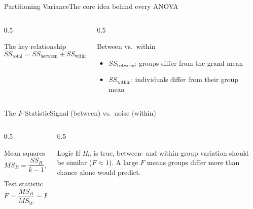 \documentclass[aspectratio=169,11pt]{beamer}
\begin{document}
\begin{frame}{Partitioning Variance}{The core idea behind every ANOVA}
  \begin{columns}[T]
    \begin{column}{0.5\textwidth}
      \begin{block}{The key relationship}
        \[ SS_{\text{total}} = SS_{\text{between}} + SS_{\text{within}} \]
      \end{block}
    \end{column}
    \begin{column}{0.5\textwidth}
      \begin{exampleblock}{Between vs.\ within}
        \small
        \begin{itemize}
          \item $SS_{\text{between}}$: groups differ from the grand mean
          \item $SS_{\text{within}}$: individuals differ from their group mean
        \end{itemize}
      \end{exampleblock}
    \end{column}
  \end{columns}
  \vfill
  \centering
\end{frame}

\begin{frame}{The $F$-Statistic}{Signal (between) vs.\ noise (within)}
  \begin{columns}[T]
    \begin{column}{0.5\textwidth}
      \begin{block}{Mean squares}
        \[ MS_B = \frac{SS_B}{k-1}, \qquad MS_W = \frac{SS_W}{N-k} \]
      \end{block}
      \begin{exampleblock}{Test statistic}
        \[ F = \frac{MS_B}{MS_W} \sim F_{k-1,\,N-k} \]
      \end{exampleblock}
    \end{column}
    \begin{column}{0.5\textwidth}
      \begin{alertblock}{Logic}
        \small If $H_0$ is true, between- and within-group variation should
        be similar ($F\approx 1$). A large $F$ means groups differ more
        than chance alone would predict.
      \end{alertblock}
    \end{column}
  \end{columns}
\end{frame}
\end{document}

